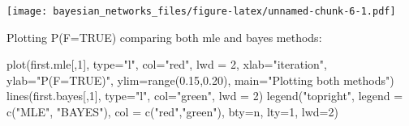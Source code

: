 \documentclass[
]{article}
\newenvironment{Shaded}{\begin{snugshade}}{\end{snugshade}}
\newcommand{\AttributeTok}[1]{\textcolor[rgb]{0.77,0.63,0.00}{#1}}
\newcommand{\CommentTok}[1]{\textcolor[rgb]{0.56,0.35,0.01}{\textit{#1}}}
\newcommand{\DecValTok}[1]{\textcolor[rgb]{0.00,0.00,0.81}{#1}}
\newcommand{\FloatTok}[1]{\textcolor[rgb]{0.00,0.00,0.81}{#1}}
\newcommand{\FunctionTok}[1]{\textcolor[rgb]{0.00,0.00,0.00}{#1}}
\newcommand{\NormalTok}[1]{#1}
\newcommand{\OtherTok}[1]{\textcolor[rgb]{0.56,0.35,0.01}{#1}}
\newcommand{\SpecialCharTok}[1]{\textcolor[rgb]{0.00,0.00,0.00}{#1}}
\newcommand{\StringTok}[1]{\textcolor[rgb]{0.31,0.60,0.02}{#1}}
\begin{document}
\begin{Shaded}
\end{Shaded}

\texttt{[image: bayesian\_networks\_files/figure-latex/unnamed-chunk-6-1.pdf]}

Plotting P(F=TRUE) comparing both mle and bayes methods:

\begin{Shaded}
\begin{Highlighting}[]
\FunctionTok{plot}\NormalTok{(first.mle[,}\DecValTok{1}\NormalTok{], }\AttributeTok{type=}\StringTok{"l"}\NormalTok{, }\AttributeTok{col=}\StringTok{"red"}\NormalTok{, }\AttributeTok{lwd =} \DecValTok{2}\NormalTok{, }\AttributeTok{xlab=}\StringTok{"iteration"}\NormalTok{, }\AttributeTok{ylab=}\StringTok{"P(F=TRUE)"}\NormalTok{, }\AttributeTok{ylim=}\FunctionTok{range}\NormalTok{(}\FloatTok{0.15}\NormalTok{,}\FloatTok{0.20}\NormalTok{), }\AttributeTok{main=}\StringTok{"Plotting both methods"}\NormalTok{)}
\FunctionTok{lines}\NormalTok{(first.bayes[,}\DecValTok{1}\NormalTok{], }\AttributeTok{type=}\StringTok{"l"}\NormalTok{, }\AttributeTok{col=}\StringTok{"green"}\NormalTok{, }\AttributeTok{lwd =} \DecValTok{2}\NormalTok{)}
\FunctionTok{legend}\NormalTok{(}\StringTok{"topright"}\NormalTok{, }\AttributeTok{legend =} \FunctionTok{c}\NormalTok{(}\StringTok{"MLE"}\NormalTok{, }\StringTok{"BAYES"}\NormalTok{), }\AttributeTok{col =} \FunctionTok{c}\NormalTok{(}\StringTok{"red"}\NormalTok{,}\StringTok{"green"}\NormalTok{), }\AttributeTok{bty=}\StringTok{\textquotesingle{}n\textquotesingle{}}\NormalTok{, }\AttributeTok{lty=}\DecValTok{1}\NormalTok{, }\AttributeTok{lwd=}\DecValTok{2}\NormalTok{)}
\end{Highlighting}
\end{Shaded}
\end{document}
